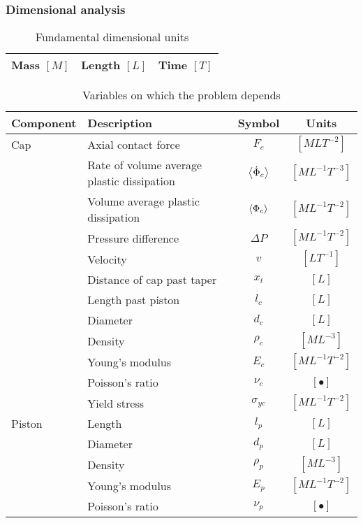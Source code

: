 \documentclass{article}
\begin{document}
\subsubsection{Dimensional analysis}

\begin{table}[!htb]
	\centering
	\caption{Fundamental dimensional units}
	\label{tab:dimentional-units}
	\begin{tabular}{c c c}
		\hline\hline
		Mass $[M]$ & Length $[L]$ & Time $[T]$\\
		\hline\hline
	\end{tabular}
\end{table}

\begin{table}[!htb]
	\centering
	\caption{Variables on which the problem depends }
	\label{tab:dimentional units}
	\begin{tabular}{l p{7cm} c c}
		\hline
		Component & Description & Symbol & Units \\
		\hline \hline
		Cap & Axial contact force & $F_{c}$ & $[MLT^{-2}]$ \\
		&Rate of volume average plastic dissipation & $\left<\dot{\Phi}_{c}\right>$ & $[ML^{-1}T^{-3}]$\\
		&Volume average plastic dissipation & $\left<\Phi_{c}\right>$ & $[ML^{-1}T^{-2}]$\\
		& Pressure difference & $\Delta P$ & $[ML^{-1}T^{-2}]$\\
		& Velocity & $v$ & $[LT^{-1}]$\\
		&Distance of cap past taper & $x_{t}$ & $[L]$\\
		&Length past piston & $l_{c}$ & $[L]$\\
		&Diameter & $d_{c}$ & $[L]$\\
		&Density & $\rho_{c}$ & $[ML^{-3}]$\\
		&Young's modulus & $E_{c}$ & $[ML^{-1}T^{-2}]$\\
		&Poisson's ratio & $\nu_{c}$ & $[\bullet]$\\
		&Yield stress & $\sigma_{yc}$ & $[ML^{-1}T^{-2}]$\\
		\hline
		Piston&Length & $l_{p}$ & $[L]$\\
		&Diameter & $d_{p}$ & $[L]$\\
		&Density & $\rho_{p}$ & $[ML^{-3}]$\\
		&Young's modulus & $E_{p}$ & $[ML^{-1}T^{-2}]$\\
		&Poisson's ratio & $\nu_{p}$ & $[\bullet]$\\

\end{tabular}
\end{table}
\end{document}
